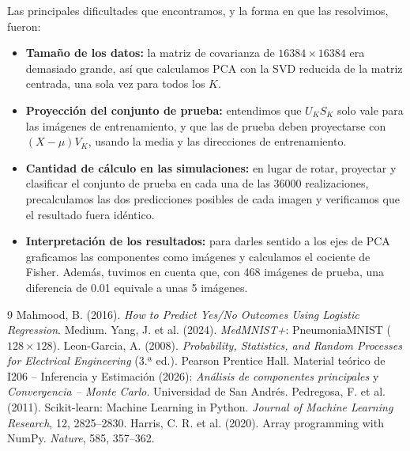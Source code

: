 \documentclass[11pt,a4paper]{article}
\begin{document}
Las principales dificultades que encontramos, y la forma en que las resolvimos, fueron:
\begin{itemize}
  \item \textbf{Tamaño de los datos:} la matriz de covarianza de $16384\times16384$ era demasiado grande, así
        que calculamos PCA con la SVD reducida de la matriz centrada, una sola vez para todos los $K$.
  \item \textbf{Proyección del conjunto de prueba:} entendimos que $U_KS_K$ solo vale para las imágenes de
        entrenamiento, y que las de prueba deben proyectarse con $(X-\mu)V_K$, usando la media y las
        direcciones de entrenamiento.
  \item \textbf{Cantidad de cálculo en las simulaciones:} en lugar de rotar, proyectar y clasificar el
        conjunto de prueba en cada una de las 36000 realizaciones, precalculamos las dos predicciones
        posibles de cada imagen y verificamos que el resultado fuera idéntico.
  \item \textbf{Interpretación de los resultados:} para darles sentido a los ejes de PCA graficamos las
        componentes como imágenes y calculamos el cociente de Fisher. Además, tuvimos en cuenta que, con
        468 imágenes de prueba, una diferencia de 0.01 equivale a unas 5 imágenes.
\end{itemize}

{\small
\begin{thebibliography}{9}
 Mahmood, B. (2016). \emph{How to Predict Yes/No Outcomes Using Logistic Regression}.
  Medium.
 Yang, J. et al. (2024). \emph{MedMNIST+}: PneumoniaMNIST ($128\times128$).
 Leon-Garcia, A. (2008). \emph{Probability, Statistics, and Random Processes for
  Electrical Engineering} (3.ª ed.). Pearson Prentice Hall.
 Material teórico de I206 -- Inferencia y Estimación (2026): \emph{Análisis de componentes
  principales} y \emph{Convergencia -- Monte Carlo}. Universidad de San Andrés.
 Pedregosa, F. et al. (2011). Scikit-learn: Machine Learning in Python.
  \emph{Journal of Machine Learning Research}, 12, 2825--2830.
 Harris, C. R. et al. (2020). Array programming with NumPy. \emph{Nature}, 585, 357--362.
\end{thebibliography}
}
\end{document}
